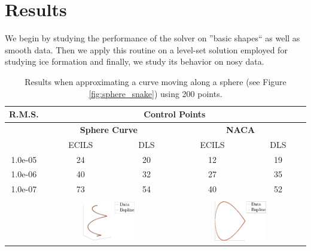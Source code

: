    
\section{Results}
We begin by studying the performance of the solver on ''basic shapes`` as well as smooth data. 
Then we apply this routine on a level-set solution employed for studying ice formation and finally, we study 
 its behavior on nosy data. 
 

 \begin{table}
 \centering
  \begin{tabular}{||c||c c || c c ||}
  \hline
 R.M.S.  &\multicolumn{4}{c||}{Control Points}\\
 \hline
  &\multicolumn{2}{c||}{\textbf{Sphere Curve}} & \multicolumn{2}{c||}{\textbf{NACA}}\\

 & ECILS& DLS & ECILS & DLS\\
 \hline
1.0e-05 & 24	& 20 & 12 & 19\\
1.0e-06 & 40	& 32 & 27 & 35\\
1.0e-07 & 73	& 54 & 40 & 52 \\
\hline
&\multicolumn{2}{c||}{}&\multicolumn{2}{c||}{}\\
&\multicolumn{2}{c||}{\includegraphics[width=0.42\textwidth]{snake-crop}}
&\multicolumn{2}{c||}{\includegraphics[width=0.42\textwidth]{naca27-crop} }\\
\hline
\end{tabular}
\caption{Results when approximating a curve moving along a sphere (see Figure \ref{fig:sphere_snake}) using 200 points.}
 \end{table}

